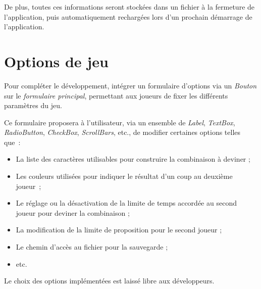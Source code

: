 \documentclass[10pt,a4paper,oneside]{article}
\begin{document}
\medskip

De plus, toutes ces informations seront stockées dans un fichier à la fermeture de l'application, puis automatiquement rechargées lors d'un prochain démarrage de l'application.

\section{Options de jeu}

Pour compléter le développement, intégrer un formulaire d'options via un {\em Bouton} sur le {\em formulaire principal}, permettant aux joueurs de fixer les différents paramètres du jeu.

\medskip

Ce formulaire proposera à l'utilisateur, via un ensemble de {\em Label}, {\em TextBox}, {\em RadioButton}, {\em CheckBox}, {\em ScrollBars}, etc., de modifier certaines options telles que~:

\medskip

\begin{itemize}
  \item La liste des caractères utilisables pour construire la combinaison à deviner ;
  \item Les couleurs utilisées pour indiquer le résultat d'un coup au deuxième joueur~;
  \item Le réglage ou la désactivation de la limite de temps accordée au second joueur pour deviner la combinaison ;
  \item La modification de la limite de proposition pour le second joueur ;
  \item Le chemin d'accès au fichier pour la sauvegarde ;
  \item etc.
\end{itemize}

\medskip

Le choix des options implémentées est laissé libre aux développeurs.
\end{document}
